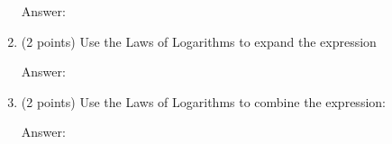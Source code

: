 \documentclass[11pt]{article}
\begin{document}
\begin{enumerate}
 \begin{flushright}{ Answer:\underline{\hspace{2in}}}\end{flushright}
\vfill
\item (2 points) Use the Laws of Logarithms to expand the expression\\ 

 \begin{flushright}{ Answer:\underline{\hspace{2in}}}\end{flushright}
\vfill
\item (2 points) Use the Laws of Logarithms to combine the expression:\\

 \fbox{\scalebox{1.2}{$ \log_a(a+b)+\log_a(a-b)-2\log_ac$}} \begin{flushright}{ Answer:\underline{\hspace{2in}}}\end{flushright}
\vfill



\end{enumerate}
\end{document}
